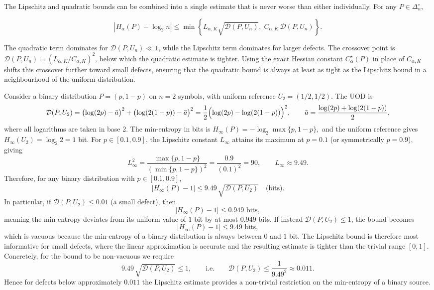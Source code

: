 \begin{remark}
\label{rem:interpolated-bound}

The Lipschitz and quadratic bounds can be combined into a single
estimate that is never worse than either individually.  For any
\(P\in\Delta_n^\circ\),

\[
|H_\alpha(P)-\log_2 n|
\le
\min\left\{
L_{\alpha,K}\sqrt{\mathcal D(P,U_n)},
\;
C_{\alpha,K}\,\mathcal D(P,U_n)
\right\}.
\]

The quadratic term dominates for \(\mathcal D(P,U_n)\ll 1\), while the
Lipschitz term dominates for larger defects.  The crossover point is
\(\mathcal D(P,U_n) = (L_{\alpha,K}/C_{\alpha,K})^2\), below which the
quadratic estimate is tighter.  Using the exact Hessian constant
\(C_\alpha^{\star}(P)\) in place of \(C_{\alpha,K}\) shifts this
crossover further toward small defects, ensuring that the quadratic
bound is always at least as tight as the Lipschitz bound in a
neighbourhood of the uniform distribution.
\end{remark}
\begin{example}
\label{ch:ex:16-6}
Consider a binary distribution \(P=(p,1-p)\) on \(n=2\) symbols, with
uniform reference \(U_2=(1/2,1/2)\). The UOD is
\[
\mathcal D(P,U_2)
=
\bigl(\log(2p)-\bar a\bigr)^2
+
\bigl(\log(2(1-p))-\bar a\bigr)^2
=
\frac12\Bigl(\log(2p)-\log(2(1-p))\Bigr)^2,
\qquad
\bar a=\frac{\log(2p)+\log(2(1-p))}{2},
\]
where all logarithms are taken in base 2. The min-entropy in bits is
$H_\infty(P)=-\log_2\max\{p,1-p\},$
and the uniform reference gives \(H_\infty(U_2)=\log_2 2 = 1\) bit.
For \(p\in[0.1,0.9]\), the Lipschitz constant \(L_\infty\) attains its
maximum at \(p=0.1\) (or symmetrically \(p=0.9\)), giving
\[
L_\infty^2
=
\frac{\max\{p,1-p\}}{(\min\{p,1-p\})^2}
=
\frac{0.9}{(0.1)^2}=90,
\qquad
L_\infty\approx9.49.
\]
Therefore, for any binary distribution with \(p\in[0.1,0.9]\),
\[
|H_\infty(P)-1|
\le
9.49\,\sqrt{\mathcal D(P,U_2)}\quad\text{(bits)}.
\]
In particular, if \(\mathcal D(P,U_2)\le0.01\) (a small defect), then
\[
|H_\infty(P)-1|\le0.949\text{ bits},
\]
meaning the min-entropy deviates from its uniform value of 1 bit by at most
\(0.949\) bits.
If instead \(\mathcal D(P,U_2)\le1\), the bound becomes
\[
|H_\infty(P)-1|\le9.49\text{ bits},
\]
which is vacuous because the min-entropy of a binary distribution is
always between \(0\) and \(1\) bit. The Lipschitz bound is therefore
most informative for small defects, where the linear approximation
is accurate and the resulting estimate is tighter than the trivial
range \([0,1]\).
Concretely, for the bound to be non-vacuous we require
\[
9.49\,\sqrt{\mathcal D(P,U_2)}\le 1,
\qquad\text{i.e.}\qquad
\mathcal D(P,U_2)\le\frac{1}{9.49^2}\approx0.011.
\]
Hence for defects below approximately \(0.011\) the Lipschitz estimate
provides a non-trivial restriction on the min-entropy of a binary source.
\end{example}
